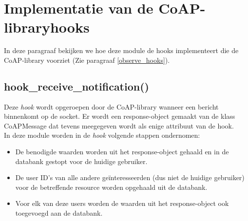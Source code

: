 
\section{Implementatie van de CoAP-libraryhooks}
In deze paragraaf bekijken we hoe deze module de hooks implementeert die de CoAP-library voorziet (Zie paragraaf \ref{observe_hooks}).

\subsection{hook\_receive\_notification()}
Deze \textit{hook} wordt opgeroepen door de CoAP-library wanneer een bericht binnenkomt op de socket. Er wordt een response-object gemaakt van de klass CoAPMessage dat tevens meegegeven wordt als enige attribuut van de hook.\\
In deze module worden in de \textit{hook} volgende stappen ondernomen:
\begin{itemize}
\item De benodigde waarden worden uit het response-object gehaald en in de databank gestopt voor de huidige gebruiker.
\item De user ID's van alle andere ge\"{i}nteresseerden (dus niet de huidige gebruiker) voor de betreffende resource worden opgehaald uit de databank.
\item Voor elk van deze users worden de waarden uit het response-object ook toegevoegd aan de databank.
\end{itemize}

